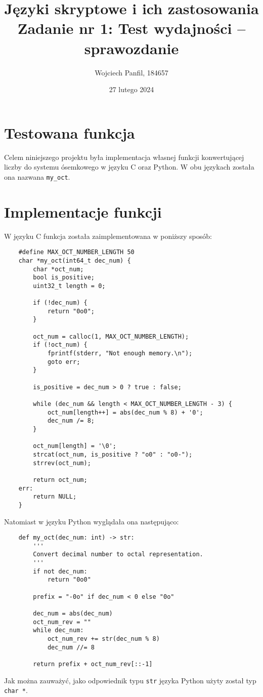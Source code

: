 \documentclass[11pt]{article}
\title{
	\textbf{Języki skryptowe i ich zastosowania}\\
	Zadanie nr 1: Test wydajności -- sprawozdanie}
\author{Wojciech Panfil, 184657}
\date{27 lutego 2024}
\begin{document}
	\maketitle
	
	\section{Testowana funkcja}
	Celem niniejszego projektu była implementacja własnej funkcji
	konwertującej liczby do systemu ósemkowego w języku C oraz Python.
	W obu językach została ona nazwana \texttt{my\_oct}.

	\section{Implementacje funkcji}
	W języku C funkcja została zaimplementowana w poniższy sposób:
	\begin{lstlisting}
	#define MAX_OCT_NUMBER_LENGTH 50
	char *my_oct(int64_t dec_num) {
		char *oct_num;
		bool is_positive;
		uint32_t length = 0;
		
		if (!dec_num) {
			return "0o0";
		}

		oct_num = calloc(1, MAX_OCT_NUMBER_LENGTH);
		if (!oct_num) {
			fprintf(stderr, "Not enough memory.\n");
			goto err;
		}

		is_positive = dec_num > 0 ? true : false;

		while (dec_num && length < MAX_OCT_NUMBER_LENGTH - 3) {
			oct_num[length++] = abs(dec_num % 8) + '0';
			dec_num /= 8;
		}

		oct_num[length] = '\0';
		strcat(oct_num, is_positive ? "o0" : "o0-");
		strrev(oct_num);

		return oct_num;
	err:
		return NULL;
	}
	\end{lstlisting}

	Natomiast w języku Python wyglądała ona następująco:

	\begin{lstlisting}
	def my_oct(dec_num: int) -> str:
		'''
		Convert decimal number to octal representation.
		'''
		if not dec_num:
			return "0o0"

		prefix = "-0o" if dec_num < 0 else "0o"

		dec_num = abs(dec_num)
		oct_num_rev = ""
		while dec_num:
			oct_num_rev += str(dec_num % 8)
			dec_num //= 8

		return prefix + oct_num_rev[::-1]
	\end{lstlisting}
	
	Jak można zauważyć, jako odpowiednik typu \lstinline{str} języka Python użyty został typ \lstinline{char *}.
\end{document}
